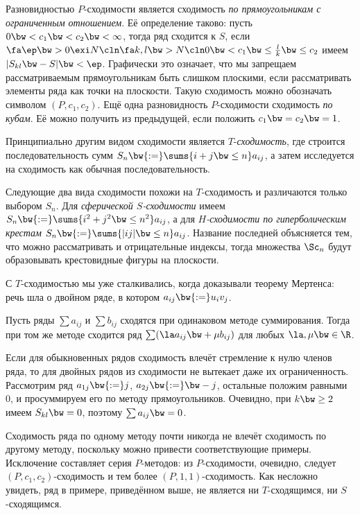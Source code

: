 \documentclass[a4paper]{article}
\begin{document}
Разновидностью $P$-сходимости является сходимость \emph{по прямоугольникам с ограниченным
отношением}. Её определение таково: пусть $0 \bw< c_1 \bw< c_2 \bw< \infty$, тогда ряд сходится к
$S$, если $\fa \ep \bw> 0 \exi N\cln \fa k, l\bw> N\cln 0 \bw< c_1 \bw\le \frac{l}{k} \bw\le c_2$
имеем $|S_{kl} \bw- S| \bw< \ep$. Графически это означает, что мы запрещаем рассматриваемым
прямоугольникам быть слишком плоскими, если рассматривать элементы ряда как точки на плоскости.
Такую сходимость можно обозначать символом $(P, c_1,c_2)$. Ещё одна разновидность $P$-сходимости
сходимость \emph{по кубам}. Её можно получить из предыдущей, если положить $c_1 \bw= c_2 \bw= 1$.

Принципиально другим видом сходимости является $T$-\emph{сходимость}, где строится
последовательность сумм $S_n \bw{:=} \sums{i+j \bw\le n} a_{ij}$, а затем исследуется на сходимость
как обычная последовательность.

Следующие два вида сходимости похожи на $T$-сходимость и различаются только выбором $S_n$. Для
\emph{сферической $S$-сходимости} имеем $S_n \bw{:=} \sums{i^2+j^2 \bw\le n^2} a_{ij}$, а для
\emph{$H$-сходимости по гиперболическим крестам} $S_n \bw{:=} \sums{|ij| \bw\le n} a_{ij}$.
Название последней объясняется тем, что можно рассматривать и отрицательные индексы, тогда
множества $\Sc_n$ будут образовывать крестовидные фигуры на плоскости.

\begin{note}
С $T$-сходимостью мы уже сталкивались, когда доказывали теорему Мертенса: речь шла о двойном ряде,
в котором $a_{ij} \bw{:=} u_iv_j$.
\end{note}

\begin{theorem}
Пусть ряды $\sum a_{ij}$ и $\sum b_{ij}$ сходятся при одинаковом методе суммирования. Тогда при том же методе
сходится ряд $\sum (\la a_{ij} \bw+ \mu b_{ij})$ для любых $\la, \mu \bw\in \R$.
\end{theorem}

\begin{ex}
Если для обыкновенных рядов сходимость влечёт стремление к нулю членов ряда, то для двойных рядов
из сходимости не вытекает даже их ограниченность. Рассмотрим ряд $a_{1j} \bw{:=} j$, $a_{2j}
\bw{:=} \bw-j$, остальные положим равными 0, и просуммируем его по методу прямоугольников. Очевидно,
при $k \bw\ge 2$ имеем $S_{kl} \bw= 0$, поэтому $\sum a_{ij} \bw= 0$.
\end{ex}

\begin{note}
Сходимость ряда по одному методу почти никогда не влечёт сходимость по другому методу, поскольку
можно привести соответствующие примеры. Исключение составляет серия $P$-методов: из $P$-сходимости,
очевидно, следует $(P, c_1,c_2)$-сходимость и тем более $(P,1,1)$-сходимость. Как несложно увидеть,
ряд в примере, приведённом выше, не является ни $T$-сходящимся, ни $S$-сходящимся.
\end{note}
\end{document}
